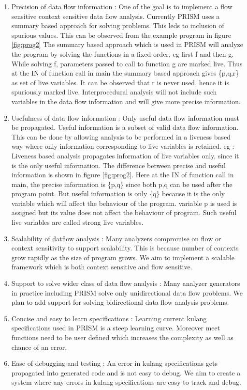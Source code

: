 \documentclass[12pt]{report}
\begin{document}
\begin{enumerate}
\item Precision of data flow information : One of the goal is to implement a flow sensitive context sensitive data flow analysis. Currently PRISM uses a summary based approach for solving problems. This leds to inclusion of spurious values. This can be observed from the example program in figure \ref{fig:prog2} The summary based approach which is used in PRISM will analyze the program by solving the functions in a fixed order, eg first f and then g. While solving f, parameters passed to call to function g are marked live. Thus at the IN of function call in main the summary based approach gives \{p,q,r\} as set of live variables. It can be observed that r is never used, hence it is spuriously marked live. Interprocedural analysis will not include such variables in the data flow information and will give more precise information.

\item Usefulness of data flow information :  Only useful data flow information must be propagated. Useful information is a subset of valid data flow information. This can be done by allowing analysis to be performed in a liveness based way where only information corresponding to live variables is retained. eg : Liveness based analysis propagates information of live variables only, since it is the only useful information. The difference between precise and useful information is shown in figure \ref{fig:prog2}. Here at the IN of function call in main, the precise information is \{p,q\} since both p,q can be used after the program point. But useful information is only \{q\} because it is the only variable which will affect the behaviour of the program. variable p is used is assigned but its value does not affect the behaviour of program. Such useful live variables are called strong live variables.
\item Scalability of datflow analysis : Many analyzers compromise on flow or context sensitivity to support scalability. This is because number of contexts grow rapidly as the size of program grows. We aim to implement a scalable framework which is both context sensitive and flow sensitive.


\item Support to solve wider class of data flow analysis : Many analyzer generators in practice including PRISM solve only unidirectional data flow problems. We plan to add support for solving bidirectional data flow analysis problems.
\item Concise and easy to learn specifications : Learning current kulang specifications used in PRISM is a steep learning curve. Moreover meet functions need to be user defined which increases the complexity as well as chance of an error. 
\item Ease of debugging and testing : An error in kulang specifications gets propagated into generated code and is not easy to debug. We aim to create a system where any errors in kulang specifications are easy to track and debug.
\end{enumerate}
\end{document}
